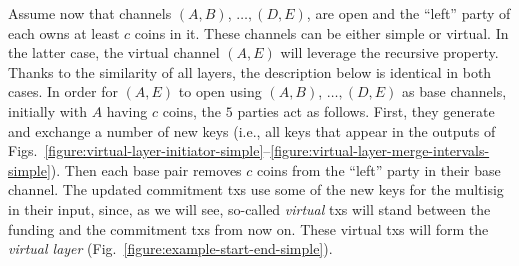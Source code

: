   Assume now that channels $(A, B)$, $\dots,(D, E)$, are open and the ``left''
  party of each owns at least $c$ coins in it. These channels can be either
  simple or virtual. In the latter case, the virtual channel $(A, E)$ will
  leverage the recursive property.
  Thanks to the similarity of all layers, the description below is identical in
  both cases. In order for $(A, E)$ to open using $(A, B)$,
  $\dots,(D, E)$ as base channels, initially with $A$ having $c$ coins, the
  $5$ parties act as follows. First, they generate and exchange a number of new
  keys (i.e., all keys that appear in the outputs of
  Figs.~\ref{figure:virtual-layer-initiator-simple}--\ref{figure:virtual-layer-merge-intervals-simple}). Then
  each base pair removes $c$ coins from the ``left'' party in
  their base channel. The updated commitment txs use some of the new
  keys for the multisig in their input, since, as we will see, so-called \emph{virtual}
  txs will stand between the funding and the commitment txs from now on. These
  virtual txs will form the \emph{virtual layer} (Fig.~\ref{figure:example-start-end-simple}).

